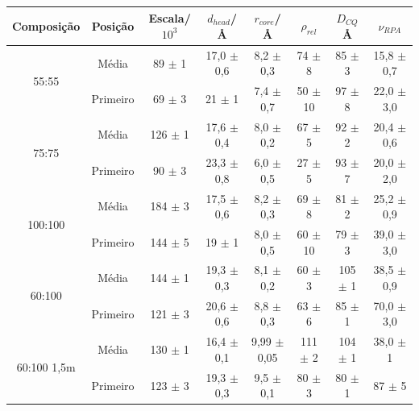 	
	\begin{table}[h]
		{%
			\begin{tabular}{c c | c c c c c c}
				\toprule
				            Composição             & Posição  & Escala/\(10^3\) & \(d_{head}\)/\AA    & \(r_{core}\)/\AA       & \(\rho_{rel}\)   & \(D_{CQ}\)\AA & \(\nu_{RPA}\)      \\ \midrule
				   \multirow{2}{*}{55:55}    & Média    & 89  \(\pm\) 1   & 17,0   \(\pm\) 0,6 & 8,2      \(\pm\) 0,3  & 74   \(\pm\)  8  & 85 \(\pm\) 3  & 15,8   \(\pm\) 0,7 \\
				                             & Primeiro & 69  \(\pm\) 3   & 21   \(\pm\) 1     & 7,4      \(\pm\) 0,7  & 50    \(\pm\) 10 & 97 \(\pm\) 8  & 22,0   \(\pm\) 3,0 \\
				   \multirow{2}{*}{75:75}    & Média    & 126  \(\pm\) 1  & 17,6   \(\pm\) 0,4 & 8,0      \(\pm\) 0,2  & 67   \(\pm\)  5  & 92 \(\pm\) 2  & 20,4   \(\pm\) 0,6 \\
				                             & Primeiro & 90  \(\pm\) 3   & 23,3   \(\pm\) 0,8 & 6,0      \(\pm\) 0,5  & 27   \(\pm\)  5  & 93 \(\pm\) 7  & 20,0   \(\pm\) 2,0 \\
				  \multirow{2}{*}{100:100}   & Média    & 184  \(\pm\) 3  & 17,5   \(\pm\) 0,6 & 8,2      \(\pm\) 0,3  & 69   \(\pm\)  8  & 81 \(\pm\) 2  & 25,2   \(\pm\) 0,9 \\
				                             & Primeiro & 144  \(\pm\) 5  & 19   \(\pm\) 1     & 8,0      \(\pm\) 0,5  & 60    \(\pm\) 10 & 79 \(\pm\) 3  & 39,0   \(\pm\) 3,0 \\
				  \multirow{2}{*}{60:100}    & Média    & 144  \(\pm\) 1  & 19,3   \(\pm\) 0,3 & 8,1      \(\pm\) 0,2  & 60    \(\pm\) 3  & 105 \(\pm\) 1 & 38,5   \(\pm\) 0,9 \\
				                             & Primeiro & 121  \(\pm\) 3  & 20,6   \(\pm\) 0,6 & 8,8      \(\pm\) 0,3  & 63   \(\pm\)  6  & 85 \(\pm\) 1  & 70,0   \(\pm\) 3,0 \\
				\multirow{2}{*}{60:100 1,5m} & Média    & 130  \(\pm\) 1  & 16,4   \(\pm\) 0,1 & 9,99     \(\pm\) 0,05 & 111   \(\pm\)  2 & 104 \(\pm\) 1 & 38,0   \(\pm\) 1   \\
				                             & Primeiro & 123  \(\pm\) 3  & 19,3   \(\pm\) 0,3 & 9,5      \(\pm\) 0,1  & 80    \(\pm\) 3  & 80 \(\pm\) 1  & 87   \(\pm\) 5     \\ \bottomrule
			\end{tabular}
		}{}
	\end{table} 

